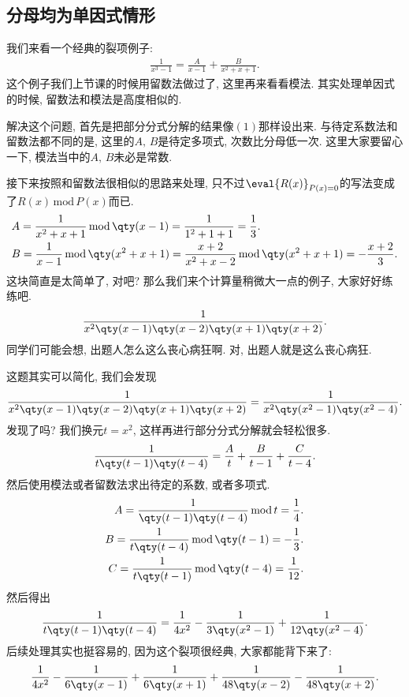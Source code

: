 \documentclass{ctexbook}
\newcommand{\m}{\,\mathrm{mod}\,}
\begin{document}
{\subsection{分母均为单因式情形}
我们来看一个经典的裂项例子: 
\begin{align*}
\frac{1}{x^{3}-1}=\frac{A}{x-1}+\frac{B}{x^{2}+x+1}\tag{1}
.\end{align*}
这个例子我们上节课的时候用留数法做过了, 这里再来看看模法. 其实处理单因式的时候, 留数法和模法是高度相似的. \par
解决这个问题, 首先是把部分分式分解的结果像$(1)$那样设出来. 与待定系数法和留数法都不同的是, 这里的$A,\,B$是待定多项式, 次数比分母低一次. 这里大家要留心一下, 模法当中的$A,\,B$未必是常数. \par
接下来按照和留数法很相似的思路来处理, 只不过$\eval{R(x)}_{P(x)=0}$的写法变成了$R(x)\m P(x)$而已. 
\begin{align*}
{}&A=\frac{1}{x^{2}+x+1}\m\qty(x-1)=\frac{1}{1^{2}+1+1}=\frac{1}{3}.\\
{}&B=\frac{1}{x-1}\m\qty(x^{2}+x+1)=\frac{x+2}{x^{2}+x-2}\m\qty(x^{2}+x+1)=-\frac{x+2}{3}
.\end{align*}
这块简直是太简单了, 对吧? 那么我们来个计算量稍微大一点的例子, 大家好好练练吧. 
\begin{align*}
\frac{1}{x^{2}\qty(x-1)\qty(x-2)\qty(x+1)\qty(x+2)}
.\end{align*}
同学们可能会想, 出题人怎么这么丧心病狂啊. 对, 出题人就是这么丧心病狂. \par
这题其实可以简化, 我们会发现
\begin{align*}
\frac{1}{x^{2}\qty(x-1)\qty(x-2)\qty(x+1)\qty(x+2)}=\frac{1}{x^{2}\qty(x^{2}-1)\qty(x^{2}-4)}
.\end{align*}
发现了吗? 我们换元$t=x^{2}$, 这样再进行部分分式分解就会轻松很多. 
\begin{align*}
\frac{1}{t\qty(t-1)\qty(t-4)}=\frac{A}{t}+\frac{B}{t-1}+\frac{C}{t-4}
.\end{align*}
然后使用模法或者留数法求出待定的系数, 或者多项式. 
\begin{align*}
A=\frac{1}{\qty(t-1)\qty(t-4)}\m t=\frac{1}{4}.\\
B=\frac{1}{t\qty(t-4)}\m\qty(t-1)=-\frac{1}{3}.\\
C=\frac{1}{t\qty(t-1)}\m\qty(t-4)=\frac{1}{12}
.\end{align*}
然后得出
\begin{align*}
\frac{1}{t\qty(t-1)\qty(t-4)}=\frac{1}{4x^{2}}-\frac{1}{3\qty(x^{2}-1)}+\frac{1}{12\qty(x^{2}-4)}
.\end{align*}
后续处理其实也挺容易的, 因为这个裂项很经典, 大家都能背下来了: 
\begin{align*}
\frac{1}{4x^{2}}-\frac{1}{6\qty(x-1)}+\frac{1}{6\qty(x+1)}+\frac{1}{48\qty(x-2)}-\frac{1}{48\qty(x+2)}
.\end{align*}
}
\end{document}
